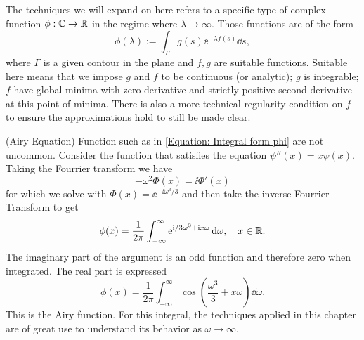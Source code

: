The techniques we will expand on here refers to a specific type of complex function $\phi: \mathbb{C} \rightarrow \mathbb{R}$ in the regime where $\lambda \rightarrow \infty$. Those functions are of the form 
\begin{equation}
	\phi(\lambda) := \int_{\Gamma} g(s) \ee^{-\lambda f(s)} \dd s,
	\label{Equation: Integral form phi}
\end{equation}
where $\Gamma$ is a given contour in the plane and $f, g$ are suitable functions. Suitable here means that we impose $g$ and $f$ to be continuous (or analytic); $g$ is integrable; $f$ have global minima with zero derivative and strictly positive second derivative at this point of minima. There is also a more technical regularity condition on $f$ to ensure the approximations hold to still be made clear.

\begin{exemplo}
	(Airy Equation) Function such as in \eqref{Equation: Integral form phi} are not uncommon. Consider the function that satisfies the equation $\psi''(x) = x \psi(x)$. Taking the Fourrier transform we have 
	\begin{equation}
		-\omega^2 \Phi(x) = \ii \Phi'(x)
	\end{equation}
	for which we solve with $\Phi(x) = \ee^{- \ii \omega^3 / 3}$ and then take the inverse Fourrier Transform to get 
	\begin{equation}
		\phi(x) = \frac{1}{2\pi} \int_{-\infty}^{\infty} \operatorname{e}^{\mathrm{i}/3 \omega^3 + \mathrm{i} x \omega} \mathrm{d} \omega, \quad x \in \mathbb{R}.
	\end{equation}
 	The imaginary part of the argument is an odd function and therefore zero when integrated. The real part is expressed 
	\begin{equation}
		\phi(x) = \frac{1}{2\pi} \int_{-\infty}^{\infty} \cos{\left( \frac{\omega^3}{3} + x \omega \right)} \dd \omega.
	\end{equation}
	This is the Airy function. For this integral, the techniques applied in this chapter are of great use to understand its behavior as $\omega \rightarrow \infty$.
\end{exemplo}

